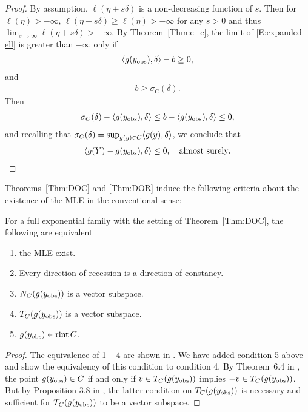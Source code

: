 \begin{proof}
By assumption, $\ell(\eta + s\delta)$ is a non-decreasing function of $s$.  
Then for $\ell(\eta ) > -\infty$, $\ell(\eta + s\delta) \geq \ell(\eta )  > -\infty$
for any $s>0$ and thus $\lim_{s \to \infty} \ell(\eta+s\delta) > -\infty$.
By Theorem~\ref{Thm:e_c}, the limit of \eqref{E:expanded ell} is greater than $-\infty$ 
only if
\begin{align*}
	\langle g(y_{\text{obs}}), \delta \rangle - b \geq 0,
\end{align*}
and
\begin{align*}
	b \geq \sigma_C(\delta). %
\end{align*}
Then
\begin{align*}
	\sigma_C(\delta)  - \langle g(y_{\text{obs}}), \delta \rangle \leq b - \langle g(y_{\text{obs}}), \delta \rangle  \leq 0,
\end{align*}
and recalling that $\sigma_C(\delta) = \sup_{g(y) \in C} \langle g(y), \delta \rangle$, 
we conclude that
\begin{align*}
	\langle g(Y) - g(y_{\text{obs}}),\delta  \rangle \leq 0, \quad \text{almost surely}.
\end{align*}
\end{proof}

Theorems~\ref{Thm:DOC} and \ref{Thm:DOR} induce the following criteria about the
existence of the MLE in the conventional sense:

\begin{theorem} \label{Thm:MLE existence}
For a full exponential family with the setting of Theorem~\ref{Thm:DOC}, the 
following are equivalent 
\begin{enumerate}
\item the MLE exist.
\item Every direction of recession is a direction of constancy.
\item $N_C(g(y_{\text{obs}}))$ is a vector subspace.
\item $T_C(g(y_{\text{obs}}))$ is a vector subspace.
\item $g(y_{\text{obs}}) \in \operatorname{rint} C$.
\end{enumerate}
\end{theorem}
\begin{proof}
The equivalence of 1 -- 4 are shown in \citet{Geyer:gdor}.  We have added condition 5 above
and show the equivalency of this condition to condition 4.  By Theorem~6.4 in 
\citet{Rockafellar:1970}, the point $g(y_{\text{obs}}) \in C$ if and only if 
$v \in T_C(g(y_{\text{obs}}))$ implies $-v \in T_C(g(y_{\text{obs}}))$.  But by Proposition 3.8 in 
\citet{Rockafellar}, the latter condition on  $T_C(g(y_{\text{obs}}))$ is necessary and sufficient 
for  $T_C(g(y_{\text{obs}}))$ to be a vector subspace.
\end{proof}


